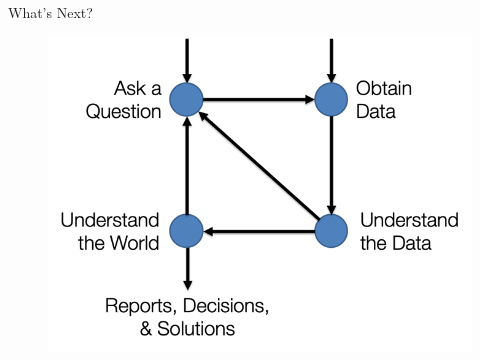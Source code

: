 \documentclass[aspectratio=169]{../latex_main/tntbeamer}  %
\begin{document}
	
	\begin{frame}[c]{What’s Next?}
	    \begin{figure}
	        \includegraphics[scale=.5]{Bild1}
	    \end{figure}   
	\end{frame}
\end{document}
